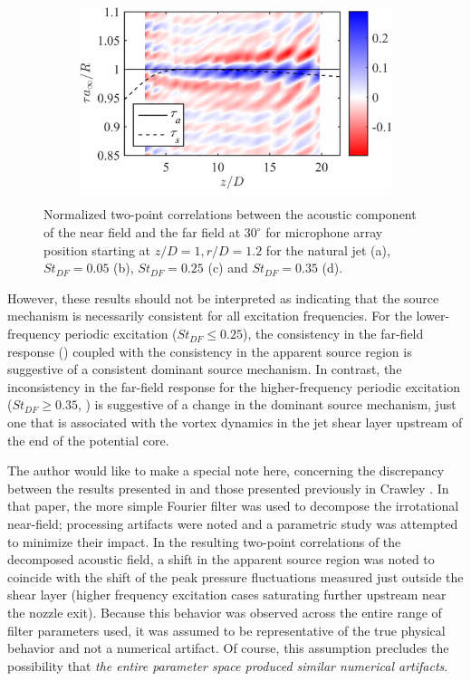 \begin{figure}
\begin{subfigure}{.5\textwidth}
		\caption{}
		\label{fig:ch3_xcorrOA_St025}
	\end{subfigure}%
	\begin{subfigure}{.5\textwidth}
		\centering
		\includegraphics[width=0.95\linewidth]{Figures/ch3_St035_r120_ff30xcor_oa.png}
		\caption{}
		\label{fig:ch3_xcorrOA_St035}
	\end{subfigure}
	\caption{Normalized two-point correlations between the acoustic component of the near field and the far field at $30^\circ$ for microphone array position starting at $z/D = 1, r/D = 1.2$ for the natural jet (a), $St_{DF} = 0.05$ (b), $St_{DF} = 0.25$ (c) and $St_{DF} = 0.35$ (d).}
	\label{fig:ch3_xcorrOA}
\end{figure}

However, these results should not be interpreted as indicating that the source mechanism is necessarily consistent for all excitation frequencies. 
For the lower-frequency periodic excitation ($St_{DF} \leq 0.25$), the consistency in the far-field response () coupled with the consistency in the apparent source region is suggestive of a consistent dominant source mechanism.
In contrast, the inconsistency in the far-field response for the higher-frequency periodic excitation ($St_{DF} \geq 0.35$, ) is suggestive of a change in the dominant source mechanism, just one that is associated with the vortex dynamics in the jet shear layer upstream of the end of the potential core.

The author would like to make a special note here, concerning the discrepancy between the results presented in  and those presented previously in Crawley \etal \citep{Crawley2015}.
In that paper, the more simple Fourier filter was used to decompose the irrotational near-field; processing artifacts were noted and a parametric study was attempted to minimize their impact.
In the resulting two-point correlations of the decomposed acoustic field, a shift in the apparent source region was noted to coincide with the shift of the peak pressure fluctuations measured just outside the shear layer (higher frequency excitation cases saturating further upstream near the nozzle exit).
Because this behavior was observed across the entire range of filter parameters used, it was assumed to be representative of the true physical behavior and not a numerical artifact.
Of course, this assumption precludes the possibility that \textit{the entire parameter space produced similar numerical artifacts}. 

